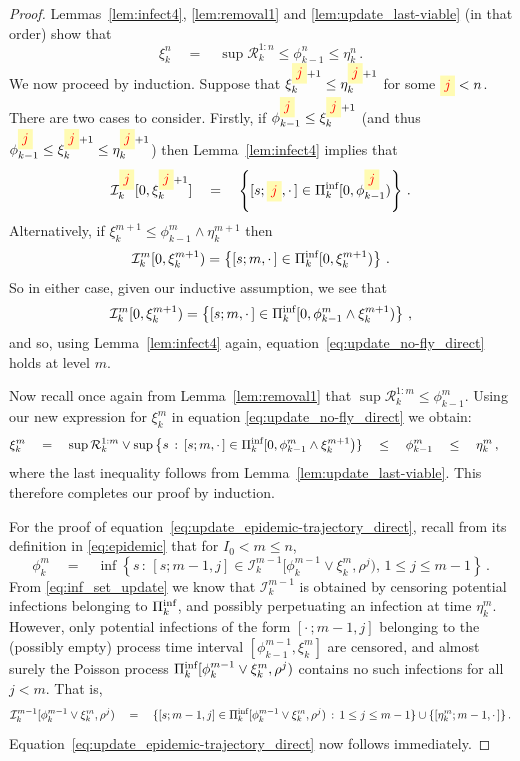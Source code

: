 \documentclass[]{article}
\newcommand{\Infections}{\mathcal{I}}
\newcommand{\Removals}{\mathcal{R}}
\newcommand{\Poisson}{\Pi}
\newcommand{\PoissonInf}{\Poisson^\textup{inf}}
\newcommand{\infectee}{{\colorbox{yellow!30}{$\textcolor{red}{j}$}}}
\begin{document}
\begin{proof}
	Lemmas~\ref{lem:infect4}, \ref{lem:removal1} and \ref{lem:update_last-viable} (in that order) show that
\[ 
\xi^n_k \quad=\quad
\sup \Removals^{1:n}_k \le \phi^n_{k-1} \le \eta^n_k \,.
\]
We now proceed by induction. 
Suppose that  \(\xi^{\infectee+1}_k \le \eta^{\infectee+1}_k\) for some \(\infectee<n\).
There are two cases to consider. 
Firstly, 
if \(\phi^\infectee_{k-1} \le \xi^{\infectee+1}_k\)
(and thus \(\phi^\infectee_{k-1} \le \xi^{\infectee+1}_k \le \eta^{\infectee+1}_k\))
then Lemma~\ref{lem:infect4} implies that 
\[ 
\Infections^\infectee_k[0,\xi^{\infectee+1}_k] 
\quad=\quad
\left\{[s;\infectee,\cdot\,]\in \PoissonInf_k[0,\phi^\infectee_{k-1})\right\}\,. 
\]
	Alternatively, if \(\xi^{m+1}_k \le \phi^m_{k-1} \wedge \eta^{m+1}_k\) then
	\[ \Infections^m_k[0,\xi^{m+1}_k) = \left\{[s;m,\cdot\,]\in \PoissonInf_k[0,\xi^{m+1}_k)\right\}\,. \]
	So in either case, given our inductive assumption, we see that 
	\[ \Infections^m_k[0,\xi^{m+1}_k) = \left\{[s;m,\cdot\,]\in \PoissonInf_k[0,\phi^m_{k-1}\wedge \xi^{m+1}_k)\right\}\,, \]
	and so, using Lemma~\ref{lem:infect4} again, equation~\eqref{eq:update_no-fly_direct} holds at level \(m\).
	
	Now recall once again from Lemma~\ref{lem:removal1} that \(\sup \Removals^{1:m}_k \le \phi^m_{k-1}\). Using our new expression for \(\xi^m_k\) in equation \eqref{eq:update_no-fly_direct} we obtain:
	\begin{align*}
		\xi^m_k \quad &= \quad \sup \Removals^{1:m}_k \vee \sup\left\{s\,:\,[s;m,\cdot\,]\in\PoissonInf_k[0,\phi^m_{k-1}\wedge \xi^{m+1}_k\right)\}\quad\le \quad \phi^m_{k-1}\quad\le \quad \eta^m_k \,,
	\end{align*}
	where the last inequality follows from Lemma~\ref{lem:update_last-viable}. This therefore completes our proof by induction.
	
	For the proof of equation~\eqref{eq:update_epidemic-trajectory_direct}, recall from its definition in \eqref{eq:epidemic} that for \(I_0<m\le n\),
	\[	
	 \phi_k^m \quad = \quad \inf\left\{s\,:\,[s;m-1,j]\in\Infections_k^{m-1}[\phi_k^{m-1}\vee \xi_k^m,\rho^j),\,1\le j\le m-1\right\} \,.
	 \]
	 From \eqref{eq:inf_set_update} we know that \(\Infections_k^{m-1}\) is obtained by censoring potential infections belonging to \(\PoissonInf_k\), and possibly perpetuating an infection at time \(\eta_k^m\). However, only potential infections of the form \([\cdot\,; m-1,j]\) belonging to the (possibly empty) process time interval \([\phi_{k-1}^{m-1},\xi_k^m]\) are censored, and almost surely the Poisson process \(\PoissonInf_k[\phi_k^{m-1}\vee \xi_k^m,\rho^j)\) contains no such infections for all \(j<m\). That is, 
	 \[
	 	\Infections_k^{m-1}[\phi_k^{m-1}\vee \xi_k^m,\rho^j)\quad =  \quad \{[s;m-1,j] \in\PoissonInf_k[\phi_k^{m-1}\vee \xi_k^m,\rho^j) \,:\, 1\le j\le m-1\} \cup \{[\eta^{m}_k;m-1,\cdot\,]\} \,.
	 \]
	 Equation~\ref{eq:update_epidemic-trajectory_direct} now follows immediately.
\end{proof}
\end{document}
